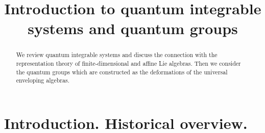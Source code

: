 \documentclass[a4paper,12pt]{article}
\theoremstyle{definition} \newtheorem{Def}{Definition}
\theoremstyle{definition} \newtheorem{Def}{Definition}
\begin{document}
\title{Introduction to quantum integrable systems and quantum groups}

\begin{abstract}
  We review quantum integrable systems and discuss the connection with the representation theory of finite-dimensional and affine Lie algebras. Then we consider the quantum groups which are constructed as the deformations of the universal enveloping algebras.
\end{abstract}

\section{Introduction. Historical overview.}
\label{sec:intr-hist-overv}


{}

\end{document}
